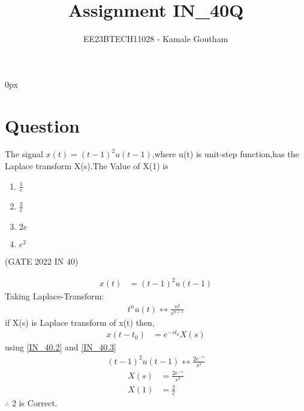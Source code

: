 \documentclass[journal,12pt,twocolumn]{IEEEtran}
\theoremstyle{remark}
\begin{document}
\parindent 0px

\title{Assignment IN\_40Q}
\author{EE23BTECH11028 - Kamale Goutham$^{}$%
}
\maketitle
\newpage
\bigskip
\section*{Question}
The signal $x(t)=(t-1)^2u(t-1)$,where u(t) is unit-step function,has the Laplace transform X(s).The Value of X(1) is 
\begin{enumerate}
    \item $\frac{1}{e}$
    \item $\frac{2}{e}$
    \item $2e$
    \item $e^2$
\end{enumerate}
\hfill{(GATE 2022 IN 40)}\\
\solution

\begin{align}
    x(t)&=(t-1)^2u(t-1) 
\end{align}
  Taking Laplace-Transform:\\
\begin{align}
    t^nu(t) \leftrightarrow \frac{n!}{s^{n+1}} \label{IN_40.2}
\end{align}
if X(s) is Laplace transform of x(t) then,\\
\begin{align}
  x(t-t_0)&=e^{-st_0}X(s)\label{IN_40.3}
\end{align}
using \ref{IN_40.2} and \ref{IN_40.3}\\
\begin{align}
    (t-1)^2u(t-1) \leftrightarrow \frac{2e^{-s}}{s^3}
\end{align}
\begin{align}
    X(s)&=\frac{2e^{-s}}{s^3}\\
    X(1)&=\frac{2}{e}
\end{align}
$\therefore$ 2 is Correct.
\end{document}
